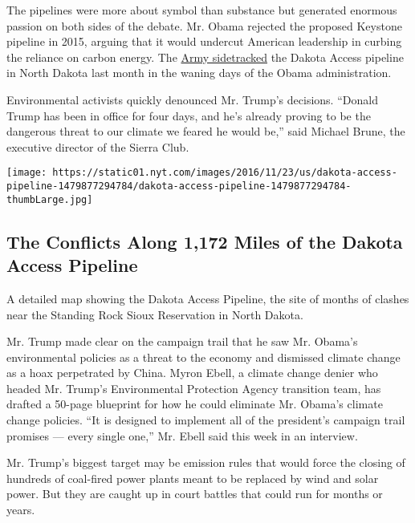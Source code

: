 The pipelines were more about symbol than substance but generated
enormous passion on both sides of the debate. Mr. Obama rejected the
proposed Keystone pipeline in 2015, arguing that it would undercut
American leadership in curbing the reliance on carbon energy. The
\href{https://www.nytimes.com/2016/12/04/us/federal-officials-to-explore-different-route-for-dakota-pipeline.html}{Army
sidetracked} the Dakota Access pipeline in North Dakota last month in
the waning days of the Obama administration.

Environmental activists quickly denounced Mr. Trump's decisions.
``Donald Trump has been in office for four days, and he's already
proving to be the dangerous threat to our climate we feared he would
be,'' said Michael Brune, the executive director of the Sierra Club.

\href{https://www.nytimes.com/interactive/2016/11/23/us/dakota-access-pipeline-protest-map.html}{}

\texttt{[image: https://static01.nyt.com/images/2016/11/23/us/dakota-access-pipeline-1479877294784/dakota-access-pipeline-1479877294784-thumbLarge.jpg]}

\hypertarget{the-conflicts-along-1172-miles-of-the-dakota-access-pipeline}{%
\subsection{The Conflicts Along 1,172 Miles of the Dakota Access
Pipeline}\label{the-conflicts-along-1172-miles-of-the-dakota-access-pipeline}}

A detailed map showing the Dakota Access Pipeline, the site of months of
clashes near the Standing Rock Sioux Reservation in North Dakota.

Mr. Trump made clear on the campaign trail that he saw Mr. Obama's
environmental policies as a threat to the economy and dismissed climate
change as a hoax perpetrated by China. Myron Ebell, a climate change
denier who headed Mr. Trump's Environmental Protection Agency transition
team, has drafted a 50-page blueprint for how he could eliminate Mr.
Obama's climate change policies. ``It is designed to implement all of
the president's campaign trail promises --- every single one,'' Mr.
Ebell said this week in an interview.

Mr. Trump's biggest target may be emission rules that would force the
closing of hundreds of coal-fired power plants meant to be replaced by
wind and solar power. But they are caught up in court battles that could
run for months or years.

